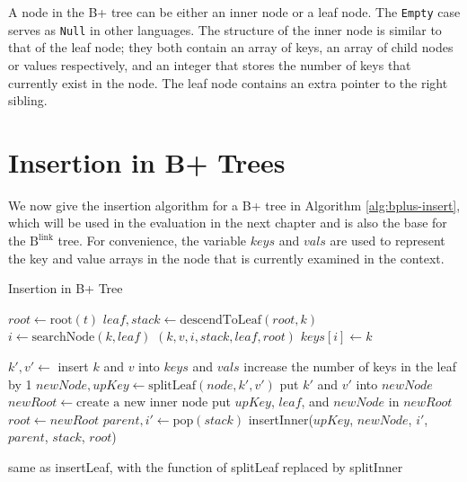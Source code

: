 \documentclass[11pt]{report}
\theoremstyle{definition}
\begin{document}
A node in the B+ tree can be either an inner node or a leaf node. The \texttt{Empty} case serves as \texttt{Null} in other languages. The structure of the inner node is similar to that of the leaf node; they both contain an array of keys, an array of child nodes or values respectively, and an integer that stores the number of keys that currently exist in the node. The leaf node contains an extra pointer to the right sibling.

\section{Insertion in B+ Trees}

We now give the insertion algorithm for a B+ tree in Algorithm \ref{alg:bplus-insert}, which will be used in the evaluation in the next chapter and is also the base for the $\text{B}^{\text{link}}$ tree. For convenience, the variable $keys$ and $vals$ are used to represent the key and value arrays in the node that is currently examined in the context.

\begin{algorithm}[h]
  \caption{Insertion in B+ Tree}\label{alg:bplus-insert}
  \begin{algorithmic}[1] %
    \State $root \gets \text{root}(t)$
    \State $leaf, stack \gets \text{descendToLeaf}(root, k)$
    \State $i \gets \text{searchNode}(k, leaf)$
    \State {}$(k, v, i, stack, leaf, root)$
    \Else \State $keys[i] \gets k$
    \EndIf
    \EndFunction

    \State $k', v' \gets$ insert $k$ and $v$ into $keys$ and $vals$
    \State {}
    \State increase the number of keys in the leaf by 1
    \Else
    \State $newNode, upKey \gets \text{splitLeaf}(node, k', v')$
    \State put $k'$ and $v'$ into $newNode$
    \State $newRoot \gets \text{create a new inner node}$
    \State put $upKey$, $leaf$, and $newNode$ in $newRoot$
    \State $root \gets newRoot$
    \Else
    \State $parent, i' \gets \text{pop}(stack)$
    \State insertInner($upKey$, $newNode$, $i'$, $parent$, $stack$, $root$)
    \EndIf
    \EndIf
    \EndFunction

    \State same as insertLeaf, with the function of splitLeaf replaced by splitInner
    \EndFunction
  \end{algorithmic}
\end{algorithm}
\end{document}
